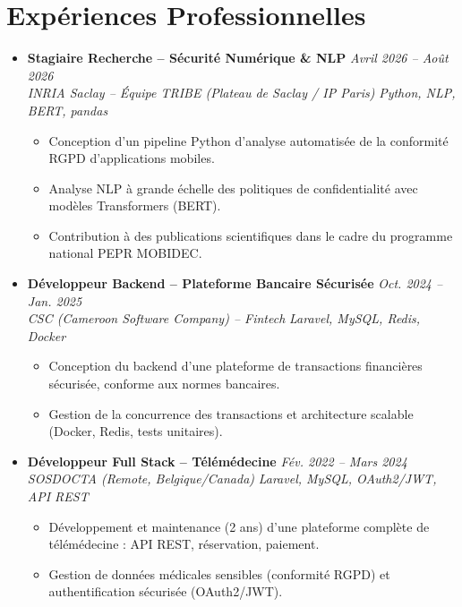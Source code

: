 \documentclass[a4paper,11pt]{article}
\begin{document}
\section{Expériences Professionnelles}
\begin{itemize}[leftmargin=*, label={-}]

\item \textbf{Stagiaire Recherche -- Sécurité Numérique \& NLP} \hfill \textit{Avril 2026 -- Août 2026} \\
\textit{INRIA Saclay -- Équipe TRIBE (Plateau de Saclay / IP Paris)} \hfill \textit{Python, NLP, BERT, pandas}
\vspace{-2pt}
    \begin{itemize}[leftmargin=0.4cm, nosep, label=\tiny$\bullet$]
        \item \small{Conception d'un pipeline Python d'analyse automatisée de la conformité RGPD d'applications mobiles.}
        \item \small{Analyse NLP à grande échelle des politiques de confidentialité avec modèles Transformers (BERT).}
        \item \small{Contribution à des publications scientifiques dans le cadre du programme national PEPR MOBIDEC.}
    \end{itemize}
\vspace{3pt}

\item \textbf{Développeur Backend -- Plateforme Bancaire Sécurisée} \hfill \textit{Oct. 2024 -- Jan. 2025} \\
\textit{CSC (Cameroon Software Company) -- Fintech} \hfill \textit{Laravel, MySQL, Redis, Docker}
\vspace{-2pt}
    \begin{itemize}[leftmargin=0.4cm, nosep, label=\tiny$\bullet$]
        \item \small{Conception du backend d'une plateforme de transactions financières sécurisée, conforme aux normes bancaires.}
        \item \small{Gestion de la concurrence des transactions et architecture scalable (Docker, Redis, tests unitaires).}
    \end{itemize}
\vspace{3pt}

\item \textbf{Développeur Full Stack -- Télémédecine} \hfill \textit{Fév. 2022 -- Mars 2024} \\
\textit{SOSDOCTA (Remote, Belgique/Canada)} \hfill \textit{Laravel, MySQL, OAuth2/JWT, API REST}
\vspace{-2pt}
    \begin{itemize}[leftmargin=0.4cm, nosep, label=\tiny$\bullet$]
        \item \small{Développement et maintenance (2 ans) d'une plateforme complète de télémédecine : API REST, réservation, paiement.}
        \item \small{Gestion de données médicales sensibles (conformité RGPD) et authentification sécurisée (OAuth2/JWT).}
    \end{itemize}
\vspace{3pt}

\end{itemize}
\end{document}
